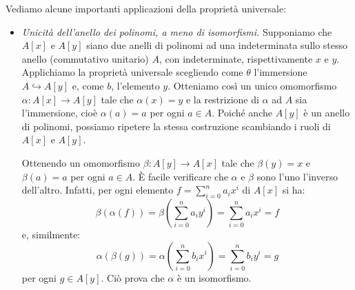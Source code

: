 Vediamo alcune importanti applicazioni della proprietà universale:
\begin{itemize}
	\item \textit{Unicità dell'anello dei polinomi, a meno di isomorfismi.} Supponiamo che $A[x]$ e $A[y]$ siano due anelli di polinomi ad una indeterminata sullo stesso anello (commutativo unitario) $A$, con indeterminate, rispettivamente $x$ e $y$. Applichiamo la proprietà universale scegliendo come $\theta$ l'immersione $A \hookrightarrow A[y]$ e, come $b$, l'elemento $y$. Otteniamo così un unico omomorfismo $\alpha: A[x] \rightarrow A[y]$ tale che $\alpha(x) = y$ e la restrizione di $\alpha$ ad $A$ sia l'immersione, cioè $\alpha(a)=a$ per ogni $a \in A$. Poiché anche $A[y]$ è un anello di polinomi, possiamo ripetere la stessa costruzione scambiando i ruoli di $A[x]$ e $A[y]$.
	\begin{center}
		\begin{minipage}{.45\textwidth}
			\centering
		\end{minipage}
		\hfil
		\begin{minipage}{.45\textwidth}
			\centering
		\end{minipage}
	\end{center}
	
	Ottenendo un omomorfismo $\beta: A[y] \rightarrow A[x]$ tale che $\beta(y)=x$ e $\beta(a)=a$ per ogni $a \in A$. È facile verificare che $\alpha$ e $\beta$ sono l'uno l'inverso dell'altro. Infatti, per ogni elemento $f= \sum_{i=0}^{n} a_{i}x^{i}$ di $A[x]$ si ha: $$\beta(\alpha(f))=\beta(\sum_{i=0}^{n}a_{i}y^{i})=\sum_{i=0}^{n}a_{i}x^{i}=f$$ e, similmente: $$\alpha(\beta(g))= \alpha(\sum_{i=0}^{n}b_{i}x^{i})=\sum_{i=0}^{n}b_{i}y^{i} = g$$ per ogni $g \in A[y]$. Ciò prova che $\alpha$ è un isomorfismo.
	

\end{itemize}
